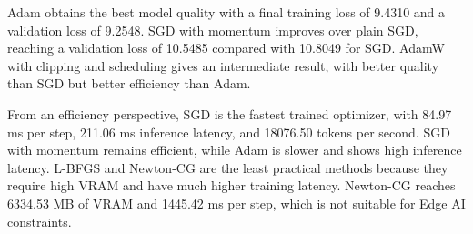 Adam obtains the best model quality with a final training loss of 9.4310 and a
validation loss of 9.2548. SGD with momentum improves over plain SGD, reaching a
validation loss of 10.5485 compared with 10.8049 for SGD. AdamW with clipping and
scheduling gives an intermediate result, with better quality than SGD but better
efficiency than Adam.

From an efficiency perspective, SGD is the fastest trained optimizer, with 84.97
ms per step, 211.06 ms inference latency, and 18076.50 tokens per second. SGD
with momentum remains efficient, while Adam is slower and shows high inference
latency. L-BFGS and Newton-CG are the least practical methods because they require
high VRAM and have much higher training latency. Newton-CG reaches 6334.53 MB of
VRAM and 1445.42 ms per step, which is not suitable for Edge AI constraints.
